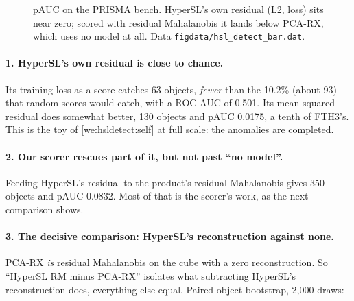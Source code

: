 \begin{figure}[htbp]
\centering
{}
\caption{pAUC on the PRISMA bench. HyperSL's own residual (L2, loss) sits near zero; scored with residual Mahalanobis it
lands below PCA-RX, which uses no model at all. Data \texttt{figdata/\allowbreak hsl\_detect\_bar.dat}.}
\label{fig:hsldetect:bar}
\end{figure}

\paragraph{1. HyperSL's own residual is close to chance.} Its training loss as a score catches 63 objects, \emph{fewer}
than the 10.2\% (about 93) that random scores would catch\tagC, with a ROC-AUC of 0.501. Its mean squared residual does
somewhat better, 130 objects and pAUC 0.0175, a tenth of FTH3's. This is the toy of \cref{we:hsldetect:self} at full
scale: the anomalies are completed.

\paragraph{2. Our scorer rescues part of it, but not past ``no model''.} Feeding HyperSL's residual to the product's
residual Mahalanobis gives 350 objects and pAUC 0.0832. Most of that is the scorer's work, as the next comparison shows.

\paragraph{3. The decisive comparison: HyperSL's reconstruction against none.} PCA-RX \emph{is} residual Mahalanobis on
the cube with a zero reconstruction. So ``HyperSL RM minus PCA-RX'' isolates what subtracting HyperSL's reconstruction
does, everything else equal. Paired object bootstrap, 2,000 draws:

